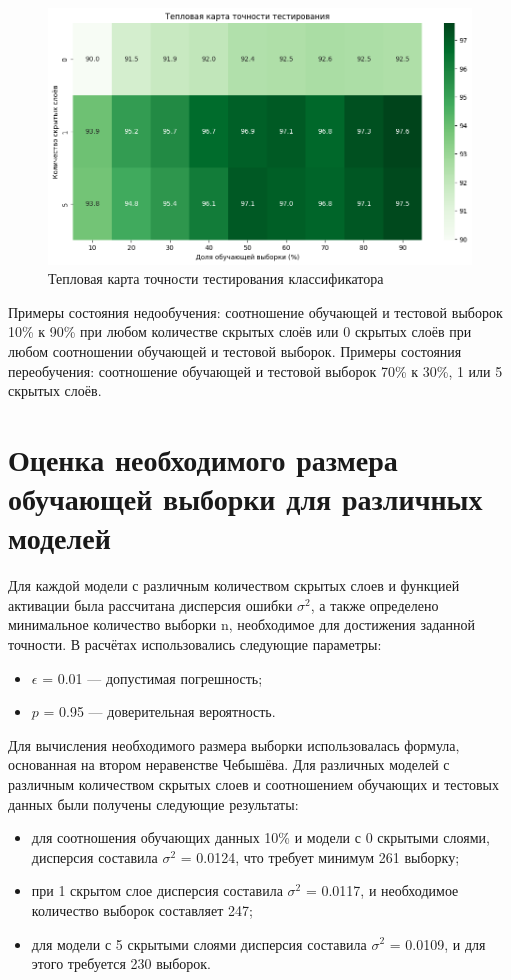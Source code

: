 \begin{figure}
	\begin{center}
		\includegraphics[width=\textwidth]{images/heatmap_test.png}
	\end{center}
	\caption{Тепловая карта точности тестирования классификатора}
	\label{img:test}
\end{figure}

Примеры состояния недообучения: соотношение обучающей и тестовой выборок 10\% к 90\% при любом количестве скрытых слоёв или 0 скрытых слоёв при любом соотношении обучающей и тестовой выборок. Примеры состояния переобучения: соотношение обучающей и тестовой выборок 70\% к 30\%, 1 или 5 скрытых слоёв.

\section{Оценка необходимого размера обучающей выборки для различных моделей}

Для каждой модели с различным количеством скрытых слоев и функцией активации была рассчитана дисперсия ошибки $\sigma^2$, а также определено минимальное количество выборки n, необходимое для достижения заданной точности. В расчётах использовались следующие параметры:
\begin{itemize}[label*=---]
	\item $\epsilon$ = 0.01 --- допустимая погрешность;
	\item $p$ = 0.95 --- доверительная вероятность.
\end{itemize}

Для вычисления необходимого размера выборки использовалась формула, основанная на втором неравенстве Чебышёва. Для различных моделей с различным количеством скрытых слоев и соотношением обучающих и тестовых данных были получены следующие результаты:
\begin{itemize}[label*=---]
	\item для соотношения обучающих данных 10\% и модели с 0 скрытыми слоями, дисперсия составила $\sigma^2$ = 0.0124, что требует минимум 261 выборку;
	\item при 1 скрытом слое дисперсия составила $\sigma^2$ = 0.0117, и необходимое количество выборок составляет 247;
	\item для модели с 5 скрытыми слоями дисперсия составила $\sigma^2$ = 0.0109, и для этого требуется 230 выборок.
\end{itemize}

